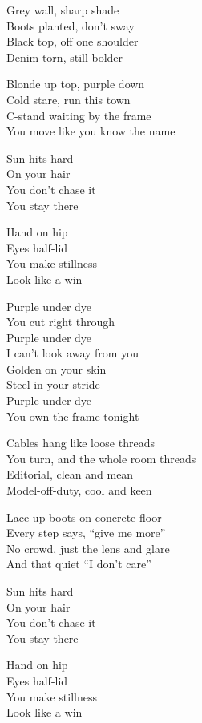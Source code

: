 \begin{lyrics}
Grey wall, sharp shade\\
Boots planted, don’t sway\\
Black top, off one shoulder\\
Denim torn, still bolder

Blonde up top, purple down\\
Cold stare, run this town\\
C-stand waiting by the frame\\
You move like you know the name

Sun hits hard\\
On your hair\\
You don’t chase it\\
You stay there

Hand on hip\\
Eyes half-lid\\
You make stillness\\
Look like a win

Purple under dye\\
You cut right through\\
Purple under dye\\
I can’t look away from you\\
Golden on your skin\\
Steel in your stride\\
Purple under dye\\
You own the frame tonight

Cables hang like loose threads\\
You turn, and the whole room threads\\
Editorial, clean and mean\\
Model-off-duty, cool and keen

Lace-up boots on concrete floor\\
Every step says, “give me more”\\
No crowd, just the lens and glare\\
And that quiet “I don’t care”

Sun hits hard\\
On your hair\\
You don’t chase it\\
You stay there

Hand on hip\\
Eyes half-lid\\
You make stillness\\
Look like a win


\end{lyrics}
